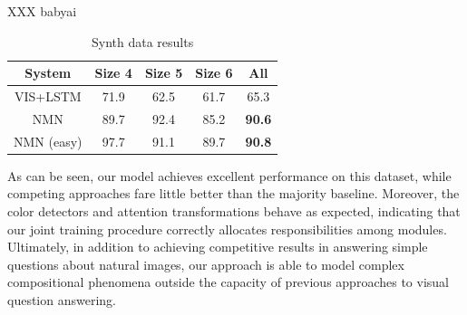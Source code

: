 XXX babyai




\begin{table}
  \footnotesize
  \centering
  \begin{tabular}{ccccc}
    \toprule
    System & Size 4 & Size 5 & Size 6 & All \\
    \midrule
    VIS+LSTM & 71.9 & 62.5 & 61.7 & 65.3 \\
    NMN      & 89.7 & 92.4 & 85.2 & \bf 90.6 \\
    NMN (easy) & 97.7 & 91.1 & 89.7 & \bf 90.8 \\
    \bottomrule
  \end{tabular}
  \caption{Synth data results}
\end{table}

As can be seen, our model achieves excellent performance on this dataset, while
competing approaches fare little better than the majority baseline. Moreover,
the color detectors and attention transformations behave as expected, indicating
that our joint training procedure correctly allocates responsibilities among
modules. Ultimately, in addition to achieving competitive results in answering
simple questions about natural images, our approach is able to model complex
compositional phenomena outside the capacity of previous approaches to visual
question answering.

